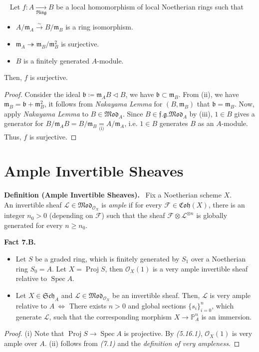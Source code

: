 \documentclass[11pt,a4paper,footinclude=true,headinclude=true]{scrbook} %
\DeclareMathOperator{\Spec}{Spec}
\DeclareMathOperator{\Proj}{Proj}
\newcommand{\FF}{\mathscr{F}}
\newcommand{\LL}{\mathscr{L}}
\newcommand{\OO}{\mathcal{O}}
\newcommand{\PP}{\mathbb{P}}
\newcommand{\bb}{\mathfrak{b}}
\newcommand{\mm}{\mathfrak{m}}
\newcommand{\Sch}{\mathfrak{Sch}}
\newcommand{\Ring}{\mathfrak{Ring}}
\newcommand{\<}{\langle}
\newcommand{\>}{\rangle}
\newcommand{\isolongto}{\overset{\sim}{\longrightarrow}}
\newcommand{\fg}{\mathfrak{f.g.}}
\newcommand{\MOD}{\mathfrak{Mod}}
\newcommand{\coh}{\mathfrak{Coh}}
\newenvironment{lemma}[2][]
{\renewcommand\theinnercustomlemma{#2}\innercustomlemma[#1]
\begin{mdframed}[backgroundcolor=gray!20]\ }
{\end{mdframed}\endinnercustomprop}
\newenvironment{definition}[2][Definition]
    { \begin{mdframed}[backgroundcolor=gray!20] \textbf{#1 #2.}\ }
    {  \end{mdframed}}
\newenvironment{fact}[2][Fact]
    { \begin{mdframed}[backgroundcolor=gray!20] \textbf{#1 #2.} }
    {  \end{mdframed}}
\begin{document}
\begin{lemma}{7.4}
    Let $f:A\xrightarrow[\Ring]{}B$ be a local homomorphism of local Noetherian rings such that
    \begin{itemize}
        \item[(i)] $A/\mm_A\isolongto B/\mm_B$ is a ring isomorphism.
        \item[(ii)] $\mm_A\twoheadrightarrow\mm_B/\mm_B^2$ is surjective.
        \item[(iii)] $B$ is a finitely generated $A$-module.
    \end{itemize}
    Then, $f$ is surjective.
\end{lemma}
\begin{proof}
    Consider the ideal $\bb\coloneqq\mm_AB\triangleleft B$, we have $\bb\subset\mm_B$. From (ii), we have $\mm_B=\bb+\mm_B^2$, it follows from \textit{Nakayama Lemma} for $(B,\mm_B)$ that $\bb=\mm_B$. Now, apply \textit{Nakayama Lemma} to $B\in\MOD_A$. Since $B\in\fg\MOD_A$ by (iii), $1\in B$ gives a generator for $B/\mm_AB=B/\mm_B\underset{\text{(i)}}{=}A/\mm_A$, i.e. $1\in B$ generates $B$ as an $A$-module. Thus, $f$ is surjective.
\end{proof}






\newpage
\section{Ample Invertible Sheaves}
\begin{definition}{(Ample Invertible Sheaves)}
    Fix a Noetherian scheme $X$.\\ An invertible sheaf $\LL\in\MOD_{\OO_X}$ is \textit{ample} if for every $\FF\in\coh(X)$, there is an integer $n_0>0$ (depending on $\FF$) such that the sheaf $\FF\otimes\LL^{\otimes n}$ is globally generated for every $n\geq n_0$.
\end{definition}

\begin{fact}{7.B}
    \begin{itemize}
        \item[(i)] Let $S$ be a graded ring, which is finitely generated by $S_1$ over a Noetherian ring $S_0=A$. Let $X=\Proj S$, then $\OO_X(1)$ is a very ample invertible sheaf relative to $\Spec A$.
        \item[(ii)] Let $X\in\Sch_A$ and $\LL\in\MOD_{\OO_X}$ be an invertible sheaf. Then, $\LL$ is very ample relative to $A\ \Longleftrightarrow$ There exists $n>0$ and global sections $\{s_i\}_{i=0}^n$, which generate $\LL$, such that the corresponding morphism $X\to\PP_A^n$ is an immersion.  
    \end{itemize}
\end{fact}
\begin{proof}
    (i) Note that $\Proj S\to\Spec A$ is projective. By \textit{(5.16.1)}, $\OO_X(1)$ is very ample over $A$. (ii) follows from \textit{(7.1)} and the \textit{definition of very ampleness}.
\end{proof}
\end{document}

